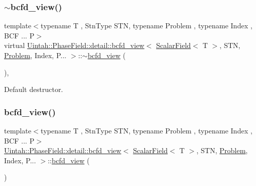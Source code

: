 \subsubsection{\texorpdfstring{$\sim$bcfd\+\_\+view()}{~bcfd\_view()}}
{\footnotesize\ttfamily template$<$typename T , Stn\+Type S\+TN, typename Problem , typename Index , B\+C\+F ... P$>$ \\
virtual \hyperlink{classUintah_1_1PhaseField_1_1detail_1_1bcfd__view}{Uintah\+::\+Phase\+Field\+::detail\+::bcfd\+\_\+view}$<$ \hyperlink{structUintah_1_1PhaseField_1_1ScalarField}{Scalar\+Field}$<$ T $>$, S\+TN, \hyperlink{classUintah_1_1PhaseField_1_1Problem}{Problem}, Index, P... $>$\+::$\sim$\hyperlink{classUintah_1_1PhaseField_1_1detail_1_1bcfd__view}{bcfd\+\_\+view} (\begin{DoxyParamCaption}{ }\end{DoxyParamCaption})\hspace{0.3cm}{\ttfamily [virtual]}, {\ttfamily [default]}}



Default destructor. 

\mbox{\label{classUintah_1_1PhaseField_1_1detail_1_1bcfd__view_3_01ScalarField_3_01T_01_4_00_01STN_00_01Problem_00_01Index_00_01P_8_8_8_01_4_a65dafd15a10a6047cc64abecb4a9a9aa}} 
\subsubsection{\texorpdfstring{bcfd\+\_\+view()}{bcfd\_view()}}
{\footnotesize\ttfamily template$<$typename T , Stn\+Type S\+TN, typename Problem , typename Index , B\+C\+F ... P$>$ \\
\hyperlink{classUintah_1_1PhaseField_1_1detail_1_1bcfd__view}{Uintah\+::\+Phase\+Field\+::detail\+::bcfd\+\_\+view}$<$ \hyperlink{structUintah_1_1PhaseField_1_1ScalarField}{Scalar\+Field}$<$ T $>$, S\+TN, \hyperlink{classUintah_1_1PhaseField_1_1Problem}{Problem}, Index, P... $>$\+::\hyperlink{classUintah_1_1PhaseField_1_1detail_1_1bcfd__view}{bcfd\+\_\+view} (\begin{DoxyParamCaption}\item[{const \hyperlink{classUintah_1_1PhaseField_1_1detail_1_1bcfd__view}{bcfd\+\_\+view}$<$ \hyperlink{structUintah_1_1PhaseField_1_1ScalarField}{Scalar\+Field}$<$ T $>$, S\+TN, \hyperlink{classUintah_1_1PhaseField_1_1Problem}{Problem}, Index, P... $>$ \&}]{ }\end{DoxyParamCaption})\hspace{0.3cm}{\ttfamily [delete]}}



